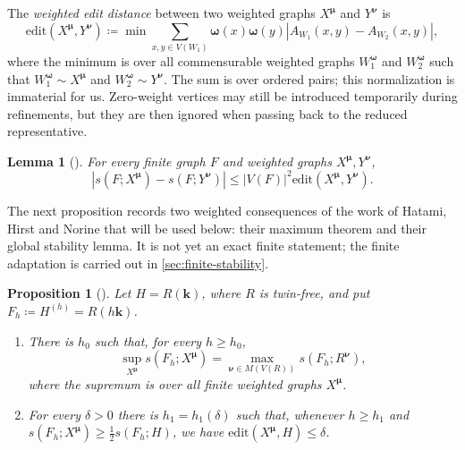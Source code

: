 \documentclass[10pt]{article}
\theoremstyle{plain}
\newtheorem{lemma}[lemma]{Lemma}
\newtheorem{proposition}[proposition]{Proposition}
\theoremstyle{remark}
\newcommand{\bmu}{{\boldsymbol{\mu}}}
\newcommand{\bnu}{{\boldsymbol{\nu}}}
\newcommand{\bomega}{{\boldsymbol{\omega}}}
\begin{document}
The \emph{weighted edit distance} between two weighted graphs $X^\bmu$ and $Y^\bnu$ is
\[
        \mathrm{edit}(X^\bmu,Y^\bnu)\coloneqq
        \min \sum_{x,y\in V(W_1)} \bomega(x)\bomega(y)
        \left|A_{W_1}(x,y)-A_{W_2}(x,y)\right|,
\]
where the minimum is over all commensurable weighted graphs $W_1^\bomega$ and $W_2^\bomega$ such that $W_1^\bomega\sim X^\bmu$ and $W_2^\bomega\sim Y^\bnu$.
The sum is over ordered pairs; this normalization is immaterial for us. Zero-weight vertices may still be introduced temporarily during refinements, but they are then ignored when passing back to the reduced representative.

\begin{lemma}[{\cite[Equation~(2.1)]{HatamiHirstNorine}}]
\label{lem:weighted-continuity}
For every finite graph $F$ and weighted graphs $X^\bmu,Y^\bnu$,
\[
        |s(F;X^\bmu)-s(F;Y^\bnu)|
        \le |V(F)|^2 \mathrm{edit}(X^\bmu,Y^\bnu).
\]
\end{lemma}

The next proposition records two weighted consequences of the work of Hatami, Hirst and Norine that will be used below: their maximum theorem and their global stability lemma. It is not yet an exact finite statement; the finite adaptation is carried out in \cref{sec:finite-stability}.

\begin{proposition}[{\cite[Theorem~3.2 and Lemma~5.1]{HatamiHirstNorine}}]
\label{prop:weighted-input}
Let $H=R(\mathbf k)$, where $R$ is twin-free, and put $F_h\coloneqq H^{(h)}=R(h\mathbf k)$.
\begin{enumerate}[label=\textup{(\alph*)},ref=\theproposition\textup{(\alph*)}]
\item\label{prop:weighted-input:maximum} There is $h_0$ such that, for every $h\ge h_0$,
\[
        \sup_{X^\bmu} s(F_h;X^\bmu)=\max_{\bnu\in M(V(R))} s(F_h;R^\bnu),
\]
where the supremum is over all finite weighted graphs $X^\bmu$.
\item\label{prop:weighted-input:global} For every $\delta>0$ there is $h_1=h_1(\delta)$ such that, whenever $h\ge h_1$ and $s(F_h;X^\bmu)\ge \frac12 s(F_h;H)$, we have $\mathrm{edit}(X^\bmu,H)\le\delta$.
\end{enumerate}
\end{proposition}
\end{document}
